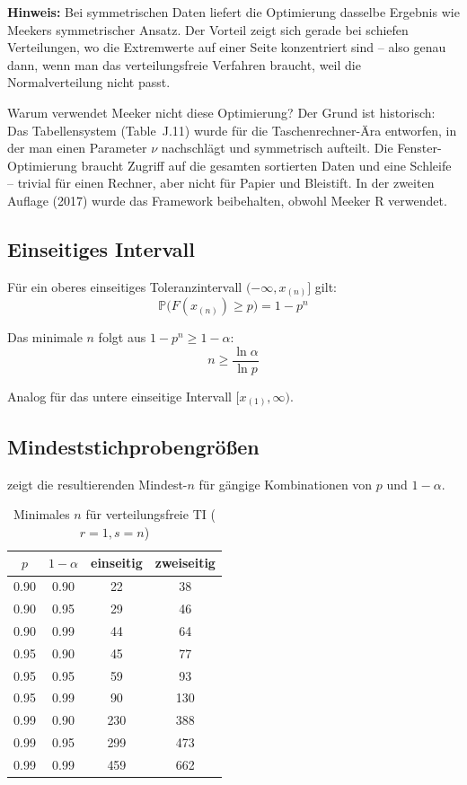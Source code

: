 \documentclass[10pt,a4paper,twocolumn]{article}
\theoremstyle{definition}
\newcommand{\hinweis}[1]{%
    \begin{center}
    \colorbox{noteblue}{\parbox{0.92\linewidth}{\small\textbf{Hinweis:} #1}}
    \end{center}
}
\newcommand{\TI}{Toleranzintervall}
\newcommand{\Prob}{\mathbb{P}}
\begin{document}
\hinweis{Bei symmetrischen Daten liefert die Optimierung dasselbe
Ergebnis wie Meekers symmetrischer Ansatz. Der Vorteil zeigt sich
gerade bei schiefen Verteilungen, wo die Extremwerte auf einer Seite
konzentriert sind -- also genau dann, wenn man das verteilungsfreie
Verfahren braucht, weil die Normalverteilung nicht passt.}

Warum verwendet Meeker nicht diese Optimierung? Der Grund ist
historisch: Das Tabellensystem (Table~J.11) wurde für die
Taschenrechner-Ära entworfen, in der man einen Parameter $\nu$
nachschlägt und symmetrisch aufteilt. Die Fenster-Optimierung
braucht Zugriff auf die gesamten sortierten Daten und eine
Schleife -- trivial für einen Rechner, aber nicht für Papier und
Bleistift. In der zweiten Auflage (2017) wurde das Framework
beibehalten, obwohl Meeker R verwendet.

\subsection{Einseitiges Intervall}

Für ein oberes einseitiges \TI{} $(-\infty, x_{(n)}]$ gilt:
\begin{equation}
    \Prob\!\big(F(x_{(n)}) \geq p\big) = 1 - p^n
    \label{eq:df_one}
\end{equation}

Das minimale $n$ folgt aus $1 - p^n \geq 1 - \alpha$:
\begin{equation}
    n \geq \frac{\ln \alpha}{\ln p}
    \label{eq:min_n_one}
\end{equation}

Analog für das untere einseitige Intervall $[x_{(1)}, \infty)$.

\subsection{Mindeststichprobengrößen}

 zeigt die resultierenden Mindest-$n$ für gängige
Kombinationen von $p$ und $1-\alpha$.

\begin{table}[H]
\centering
\caption{Minimales $n$ für verteilungsfreie TI
($r=1, s=n$)}
\label{tab:min_n}
\small
\begin{tabular}{@{}cccc@{}}
\toprule
$p$ & $1-\alpha$ & einseitig & zweiseitig \\
\midrule
0.90 & 0.90 &  22 &  38 \\
0.90 & 0.95 &  29 &  46 \\
0.90 & 0.99 &  44 &  64 \\
\midrule
0.95 & 0.90 &  45 &  77 \\
0.95 & 0.95 &  59 &  93 \\
0.95 & 0.99 &  90 & 130 \\
\midrule
0.99 & 0.90 & 230 & 388 \\
0.99 & 0.95 & 299 & 473 \\
0.99 & 0.99 & 459 & 662 \\
\bottomrule
\end{tabular}
\end{table}
\end{document}
